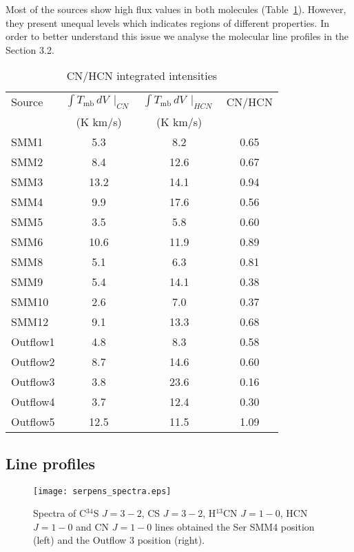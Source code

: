 \documentclass{aa}
\begin{document}
Most of the sources show high flux values in both molecules (Table~\ref{table:CN/HCN}). However, they present unequal levels which indicates regions of different properties. In order to better understand this issue we analyse the molecular line profiles in the Section 3.2.


\begin{table}
\caption{CN/HCN integrated intensities}             %
\label{table:CN/HCN}      %
\centering                          %
\begin{tabular}{l c c c} 
\hline\hline  
Source & $\int T_\mathrm{mb}\, dV \, \mid_{CN}$ &  $\int T_\mathrm{mb}\, dV \, \mid_{HCN}$ & CN/HCN \\
& (K km/s) & (K km/s) & \\
\hline
SMM1 & 5.3 & 8.2 & 0.65 \\
SMM2 & 8.4 & 12.6 & 0.67 \\
SMM3 & 13.2 & 14.1 & 0.94 \\ 
SMM4 & 9.9 & 17.6 & 0.56\\
SMM5 & 3.5 & 5.8 & 0.60 \\
SMM6 & 10.6 & 11.9 & 0.89 \\ 
SMM8 & 5.1 & 6.3 & 0.81 \\
SMM9 & 5.4 & 14.1 & 0.38 \\
SMM10 & 2.6 & 7.0 & 0.37\\ 
SMM12 & 9.1 & 13.3 & 0.68 \\ \hdashline
Outflow1 & 4.8 & 8.3 & 0.58 \\
Outflow2 & 8.7 & 14.6 & 0.60 \\
Outflow3 & 3.8 & 23.6 & 0.16 \\
Outflow4 & 3.7 & 12.4 & 0.30 \\
Outflow5 & 12.5 & 11.5 & 1.09 \\
\hline
\end{tabular}
\end{table} 

\subsection{Line profiles}

\begin{figure*}	
  \texttt{[image: serpens\_spectra.eps]}
\caption{Spectra of C$^{34}$S $J=3-2$, CS $J=3-2$, H$^{13}$CN $J=1-0$, HCN $J=1-0$ and CN $J=1-0$ lines obtained the Ser SMM4 position (left) and the Outflow 3 position (right).}
\label{spectra}
\end{figure*}
\end{document}
